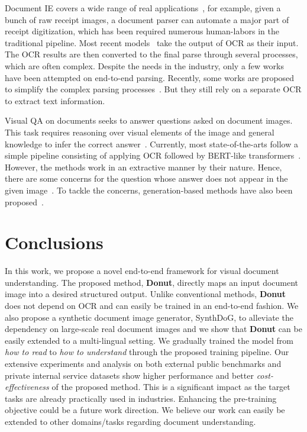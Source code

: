 \documentclass[runningheads]{llncs}
\newcommand\oursb{{\textbf{\mbox{Donut}}}\xspace}
\begin{document}
Document IE covers a wide range of real applications~\cite{hwang2019pot,majumder2020representation}, for example, given a bunch of raw receipt images, a document parser can automate a major part of receipt digitization, which has been required numerous human-labors in the traditional pipeline.
Most recent models~\cite{hwang-etal-2021-spatial,hwang2021costeffective} take the output of OCR as their input.
The OCR results are then converted to the final parse through several processes, which are often complex.
Despite the needs in the industry, only a few works have been attempted on end-to-end parsing. Recently, some works are proposed to simplify the complex parsing processes~\cite{hwang-etal-2021-spatial,hwang2021costeffective}.
But they still rely on a separate OCR to extract text information.

Visual QA on documents seeks to answer questions asked on document images. This task requires reasoning over visual elements of the image and general knowledge to infer the correct answer~\cite{mathew2021docvqa}. Currently, most state-of-the-arts follow a simple pipeline consisting of applying OCR followed by BERT-like transformers~\cite{xu2019_layoutLM,xu-etal-2021-layoutlmv2}. However, the methods work in an extractive manner by their nature. Hence, there are some concerns for the question whose answer does not appear in the given image~\cite{icdar21docvqa}. To tackle the concerns, generation-based methods have also been proposed~\cite{10.1007/978-3-030-86331-9_47}. 
\section{Conclusions} In this work, we propose a novel end-to-end framework for visual document understanding. The proposed method, \oursb, directly maps an input document image into a desired structured output.
Unlike conventional methods, \oursb does not depend on OCR and can easily be trained in an end-to-end fashion.
We also propose a synthetic document image generator, {SynthDoG}, to alleviate the dependency on large-scale real document images and we show that \oursb can be easily extended to a multi-lingual setting.
We gradually trained the model from \textit{how to read} to \textit{how to understand} through the proposed training pipeline.
Our extensive experiments and analysis on both external public benchmarks and private internal service datasets show higher performance and better \textit{cost-effectiveness} of the proposed method. This is a significant impact as the target tasks are already practically used in industries.
Enhancing the pre-training objective could be a future work direction. We believe our work can easily be extended to other domains/tasks regarding document understanding.
 
\end{document}
